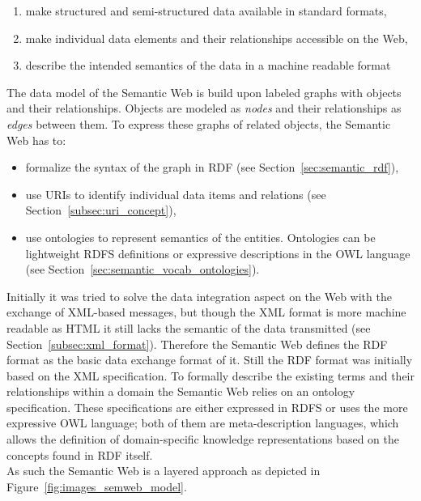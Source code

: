 \begin{enumerate}
	\item make structured and semi-structured data available in standard formats,
	\item make individual data elements and their relationships accessible on the Web,
	\item describe the intended semantics of the data in a machine readable format
\end{enumerate}

The data model of the Semantic Web is build upon labeled graphs with objects and their relationships. Objects are modeled as \emph{nodes} and their relationships as \emph{edges} between them. To express these graphs of related objects, the Semantic Web has to: \@

\begin{itemize}
	\item formalize the syntax of the graph in \gls{RDF} (see Section~\ref{sec:semantic_rdf}),
	\item use \gls{URI}s to identify individual data items and relations (see Section~\ref{subsec:uri_concept}),
	\item use ontologies to represent semantics of the entities. Ontologies can be lightweight \gls{RDFS} definitions or expressive descriptions in the \gls{OWL} language (see Section~\ref{sec:semantic_vocab_ontologies}).
\end{itemize}

Initially it was tried to solve the data integration aspect on the Web with the exchange of \gls{XML}-based messages, but though the \gls{XML} format is more machine readable as \gls{HTML} it still lacks the semantic of the data transmitted (see Section~\ref{subsec:xml_format}). Therefore the Semantic Web defines the \gls{RDF} format as the basic data exchange format of it. Still the \gls{RDF} format was initially based on the \gls{XML} specification. To formally describe the existing terms and their relationships within a domain the Semantic Web relies on an ontology specification. These specifications are either expressed in \gls{RDFS} or uses the more expressive \gls{OWL} language; both of them are meta-description languages, which allows the definition of domain-specific knowledge representations based on the concepts found in \gls{RDF} itself. \\

As such the Semantic Web is a layered approach as depicted in Figure~\ref{fig:images_semweb_model}.\@

